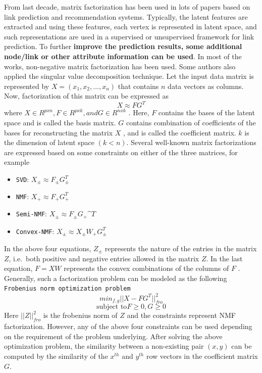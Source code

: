From last decade, matrix factorization has been used in lots of papers
based on link prediction and recommendation systems. Typically, the
latent features are extracted and using these features, each vertex is
represented in latent space, and such representations are used in a
supervised or unsupervised framework for link prediction. To further
\textbf{improve the prediction results, some additional node/link or
    other attribute information can be used}. In most of the works,
non-negative matrix factorization has been used. Some authors also
applied the singular value decomposition technique. Let the input data
matrix is represented by \(X = (x_1, x_2, ..., x_n)\) that contains
\(n\) data vectors as columns. Now, factorization of this matrix can be
expressed as \[X \approx FG^T\] where
\(X \in R^{p x n}, F \in R^{p x k} , and G \in R^{n x k}\) . Here, \(F\)
contains the bases of the latent space and is called the basis matrix.
\(G\) contains combination of coefficients of the bases for
reconstructing the matrix \(X\) , and is called the coefficient matrix.
\(k\) is the dimension of latent space \((k < n)\). Several well-known
matrix factorizations are expressed based on some constraints on either
of the three matrices, for example

\begin{itemize}
    \item \texttt{SVD}:
          \(X_\pm \approx F_\pm G_\pm^T\)
    \item \texttt{NMF}:
          \(X_+ \approx F_+ G_+^T\)
    \item \texttt{Semi-NMF}:
          $X_\pm \approx F_\pm G_+\^{T} $
    \item \texttt{Convex-NMF}:
          $X_\pm \approx  X_\pm W_+ G_\pm^{T}$
\end{itemize}

In the above four equations, \(Z_\pm\) represents the nature of the
entries in the matrix \(Z\), i.e.~both positive and negative entries
allowed in the matrix \(Z\). In the last equation, \(F = XW\) represents
the convex combinations of the columns of \(F\) . Generally, such a
factorization problem can be modeled as the following
\texttt{Frobenius\ norm\ optimization\ problem}
\[min_{f, g} ||X - FG^T||^2_{fro}\]
\[\text{subject to} F \ge 0, G \ge 0\] Here \(||Z||^2_{fro}\) is the
frobenius norm of \(Z\) and the constraints represent NMF factorization.
However, any of the above four constraints can be used depending on the
requirement of the problem underlying. After solving the above
optimization problem, the similarity between a non-existing pair
\((x, y)\) can be computed by the similarity of the \(x^{th}\) and
\(y^{th}\) row vectors in the coefficient matrix \(G\).


